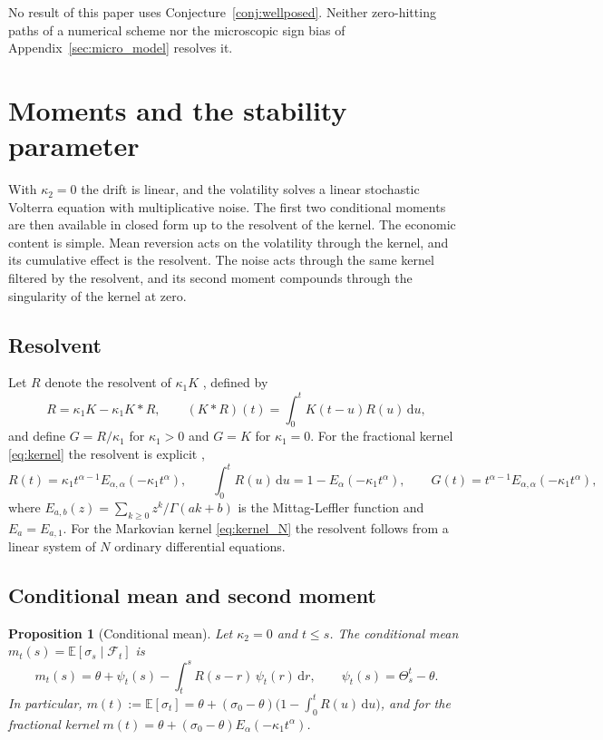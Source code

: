 \documentclass{rQUF2e}
\theoremstyle{plain}
\newtheorem{proposition}[theorem]{Proposition}
\theoremstyle{definition}
\theoremstyle{remark}
\newcommand{\D}{\mathrm{d}}
\newcommand{\E}{\mathbb{E}}
\newcommand{\F}{\mathcal{F}}
\begin{document}
No result of this paper uses Conjecture~\ref{conj:wellposed}. Neither zero-hitting paths of a numerical scheme nor the microscopic sign bias of Appendix~\ref{sec:micro_model} resolves it.

\section{Moments and the stability parameter}\label{sec:moments}

With $\kappa_2=0$ the drift is linear, and the volatility solves a linear stochastic Volterra equation with multiplicative noise. The first two conditional moments are then available in closed form up to the resolvent of the kernel. The economic content is simple. Mean reversion acts on the volatility through the kernel, and its cumulative effect is the resolvent. The noise acts through the same kernel filtered by the resolvent, and its second moment compounds through the singularity of the kernel at zero.

\subsection{Resolvent}

Let $R$ denote the resolvent of $\kappa_1K$ \citep[Chapter~2]{GripenbergLondenStaffans1990}, defined by
\begin{equation}\label{eq:resolvent}
R=\kappa_1K-\kappa_1K*R,\qquad (K*R)(t)=\int_0^tK(t-u)R(u)\,\D u,
\end{equation}
and define $G=R/\kappa_1$ for $\kappa_1>0$ and $G=K$ for $\kappa_1=0$. For the fractional kernel \eqref{eq:kernel} the resolvent is explicit \citep{ElEuchRosenbaum2019},
\begin{equation}\label{eq:resolvent_frac}
R(t)=\kappa_1t^{\alpha-1}E_{\alpha,\alpha}(-\kappa_1t^{\alpha}),\qquad \int_0^tR(u)\,\D u=1-E_\alpha(-\kappa_1t^\alpha),\qquad G(t)=t^{\alpha-1}E_{\alpha,\alpha}(-\kappa_1t^{\alpha}),
\end{equation}
where $E_{a,b}(z)=\sum_{k\ge0}z^k/\Gamma(ak+b)$ is the Mittag-Leffler function and $E_a=E_{a,1}$. For the Markovian kernel \eqref{eq:kernel_N} the resolvent follows from a linear system of $N$ ordinary differential equations.

\subsection{Conditional mean and second moment}

\begin{proposition}[Conditional mean]\label{prop:mean}
Let $\kappa_2=0$ and $t\le s$. The conditional mean $m_t(s)=\E[\sigma_s\mid\F_t]$ is
\begin{equation}\label{eq:cond_mean}
m_t(s)=\theta+\psi_t(s)-\int_t^sR(s-r)\,\psi_t(r)\,\D r,\qquad \psi_t(s)=\Theta^t_s-\theta .
\end{equation}
In particular, $m(t):=\E[\sigma_t]=\theta+(\sigma_0-\theta)\big(1-\int_0^tR(u)\,\D u\big)$, and for the fractional kernel $m(t)=\theta+(\sigma_0-\theta)E_\alpha(-\kappa_1t^\alpha)$.
\end{proposition}
\end{document}

